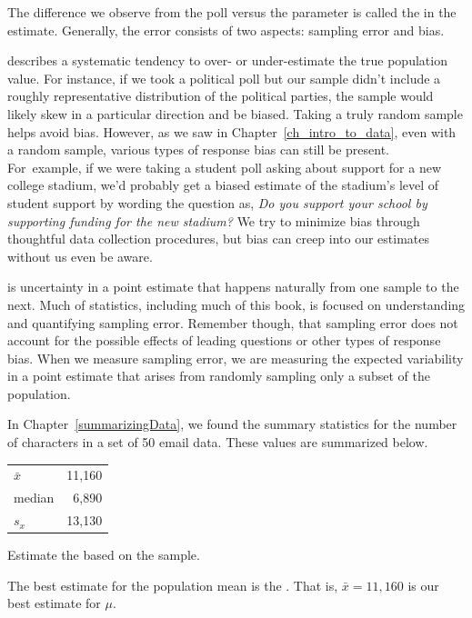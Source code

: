 The difference we observe from the poll versus
the parameter is called the  in the estimate.  Generally, the error consists of two aspects:
sampling error and bias.

 describes a systematic tendency
to over- or under-estimate the true population value.
 For instance, if we took a political poll but our sample
  didn't include a roughly representative distribution of
  the political parties, the sample would likely skew
  in a particular direction and be biased.  Taking a truly random sample helps avoid bias.  However, as we saw in Chapter~\ref{ch_intro_to_data}, even with a random sample, various types of response bias can still be present.  For~example, if we were taking a student poll asking
about support for a new college stadium, we'd probably
get a biased estimate of the stadium's level of student
support by wording the question as,
\emph{Do you support your school by supporting funding
  for the new stadium?}
We try to minimize bias through thoughtful data
collection procedures, but bias can creep into our estimates without us even be aware.

   is uncertainty in a point estimate that happens naturally from one sample to the next. Much of statistics, including much of this book, is focused on understanding and quantifying sampling error.  Remember though, that sampling error does not account for the possible effects of leading questions or other types of response bias.  When we measure sampling error, we are measuring the expected variability in a point estimate that arises from randomly sampling only a subset of the population.


\begin{examplewrap}
\begin{nexample}{
In Chapter~\ref{summarizingData}, we found the summary statistics for the number of characters in a set of 50 email data. These values are summarized below.

\begin{tabular}{l r }
$\bar{x}$ & 11,160 \\
median & 6,890 \\
$s_x$ & 13,130
\end{tabular}

Estimate the  based on the sample.}The best estimate for the population mean is the . That is,
$\bar{x} = 11,160$ is our best estimate for $\mu$.
\end{nexample}
\end{examplewrap}

